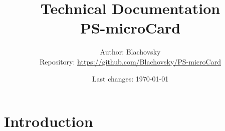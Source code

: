 \documentclass[12pt,a4paper]{article}
\title{
	\textbf{Technical Documentation}\\
	\large PS-microCard
}
\author{
	Author: Blachovsky\\
	Repository: \url{https://github.com/Blachovsky/PS-microCard}
}
\date{Last changes: \today}
\begin{document}
	
	\maketitle
	\newpage
	
	\tableofcontents
	\newpage
	

	\section{Introduction}
	
	
		
	
\end{document}
